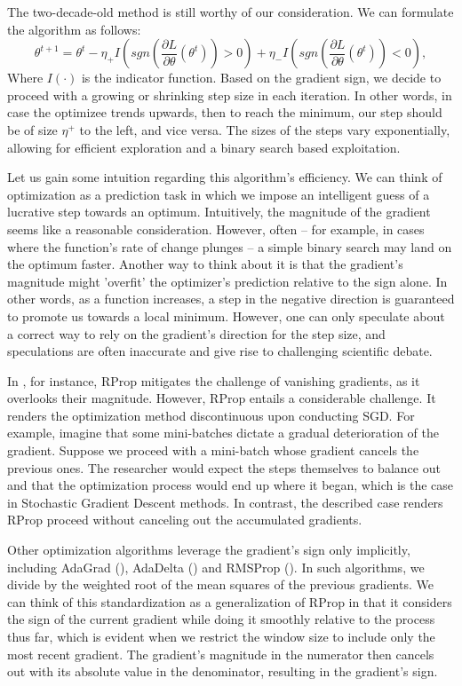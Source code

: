 \documentclass[11pt]{book}
\begin{document}
The two-decade-old method is still worthy of our consideration. We
can formulate the algorithm as follows: 
\[
\theta^{t+1}=\theta^{t}-\eta_{+}I\left(sgn\left(\frac{\partial L}{\partial\theta}\left(\theta^{t}\right)\right)>0\right)+\eta_{-}I\left(sgn\left(\frac{\partial L}{\partial\theta}\left(\theta^{t}\right)\right)<0\right),
\]
Where $I(\cdot)$ is the indicator function. Based on the gradient
sign, we decide to proceed with a growing or shrinking step size in
each iteration. In other words, in case the optimizee trends upwards,
then to reach the minimum, our step should be of size $\eta^{+}$
to the left, and vice versa. The sizes of the steps vary exponentially,
allowing for efficient exploration and a binary search based exploitation.

Let us gain some intuition regarding this algorithm's efficiency. We can think of optimization as a prediction task in which we impose an intelligent guess of a lucrative step towards an optimum. Intuitively,
the magnitude of the gradient seems like a reasonable consideration. However, often -- for example, in cases where the function's rate of change plunges -- a simple binary search may land on the optimum faster. Another way to think about it is that the gradient's magnitude might 'overfit' the optimizer's prediction relative to the sign alone. In other words, as a function increases, a step in the negative direction
is guaranteed to promote us towards a local minimum. However, one can only speculate about a correct way to rely on the gradient's direction for the step size, and speculations are often inaccurate and give rise to challenging scientific debate.

In \cite{behnke2003hierarchical}, for instance, RProp mitigates the
challenge of vanishing gradients, as it overlooks their magnitude.
However, RProp entails a considerable challenge. It renders the optimization
method discontinuous upon conducting SGD. For example, imagine that
some mini-batches dictate a gradual deterioration of the gradient.
Suppose we proceed with a mini-batch whose gradient cancels the previous
ones. The researcher would expect the steps themselves to balance
out and that the optimization process would end up where it began,
which is the case in Stochastic Gradient Descent methods. In contrast,
the described case renders RProp proceed without canceling out the
accumulated gradients.

Other optimization algorithms leverage the gradient's sign only implicitly,
including AdaGrad (\cite{lydia2019adagrad}), AdaDelta (\cite{zeiler2012adadelta})
and RMSProp (\cite{hinton2012neural}). In such algorithms, we divide
by the weighted root of the mean squares of the previous gradients.
We can think of this standardization as a generalization of RProp
in that it considers the sign of the current gradient while doing
it smoothly relative to the process thus far, which is evident when
we restrict the window size to include only the most recent gradient.
The gradient's magnitude in the numerator then cancels out with its
absolute value in the denominator, resulting in the gradient's sign.
\end{document}
